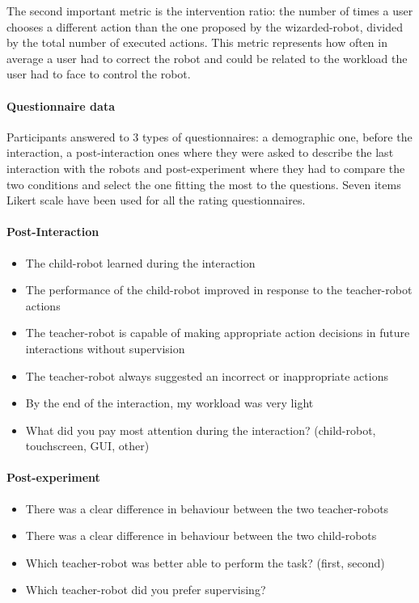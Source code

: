 The second important metric is the intervention ratio: the number of times a user chooses a different action than the one proposed by the wizarded-robot, divided by the total number of executed actions. This metric represents how often in average a user had to correct the robot and could be related to the workload the user had to face to control the robot.

\paragraph{Questionnaire data}
 
Participants answered to 3 types of questionnaires: a demographic one, before the interaction, a post-interaction ones where they were asked to describe the last interaction with the robots and post-experiment where they had to compare the two conditions and select the one fitting the most to the questions. Seven items Likert scale have been used for all the rating questionnaires.

\paragraph{Post-Interaction}
\begin{itemize}
	\item The child-robot learned during the interaction
	\item The performance of the child-robot improved in response to the teacher-robot actions
	\item The teacher-robot is capable of making appropriate action decisions in future interactions without supervision
	\item The teacher-robot always suggested an incorrect or inappropriate actions
	\item By the end of the interaction, my workload was very light
	\item What did you pay most attention during the interaction? (child-robot, touchscreen, GUI, other)
\end{itemize}

\paragraph{Post-experiment}
\begin{itemize}
	\item There was a clear difference in behaviour between the two teacher-robots
	\item There was a clear difference in behaviour between the two child-robots
	\item Which teacher-robot was better able to perform the task? (first, second)
	\item Which teacher-robot did you prefer supervising?
\end{itemize}


